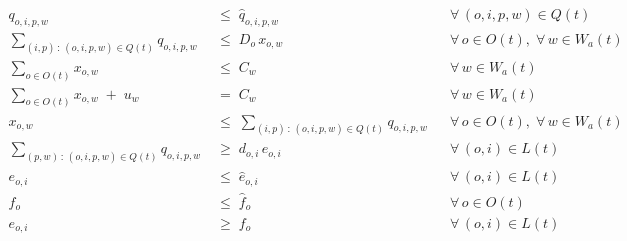 \begin{align}
q_{o,i,p,w} \;&\le\; \hat{q}_{o,i,p,w}
   && \forall\, (o,i,p,w) \in Q(t)
   \tag{B1}\\[6pt]
\sum_{(i,p) \,:\, (o,i,p,w) \in Q(t)} q_{o,i,p,w}
   \;&\le\; D_o\, x_{o,w}
   && \forall\, o \in O(t),\; \forall\, w \in W_a(t)
   \tag{B2}\\[6pt]
\sum_{o \in O(t)} x_{o,w} \;&\le\; C_w
   && \forall\, w \in W_a(t)
   \tag{B3}\\[6pt]
\sum_{o \in O(t)} x_{o,w} \;+\; u_w \;&=\; C_w
   && \forall\, w \in W_a(t)
   \tag{B3s}\\[6pt]
x_{o,w} \;&\le\; \sum_{(i,p) \,:\, (o,i,p,w) \in Q(t)} q_{o,i,p,w}
   && \forall\, o \in O(t),\; \forall\, w \in W_a(t)
   \tag{B4}\\[6pt]
\sum_{(p,w) \,:\, (o,i,p,w) \in Q(t)} q_{o,i,p,w}
   \;&\ge\; d_{o,i}\, e_{o,i}
   && \forall\, (o,i) \in L(t)
   \tag{B5}\\[6pt]
e_{o,i} \;&\le\; \hat{e}_{o,i}
   && \forall\, (o,i) \in L(t)
   \tag{B6c}\\[6pt]
f_{o} \;&\le\; \hat{f}_{o}
   && \forall\, o \in O(t)
   \tag{B6z}\\[6pt]
e_{o,i} \;&\ge\; f_{o}
   && \forall\, (o,i) \in L(t)
   \tag{B7}
\end{align}
